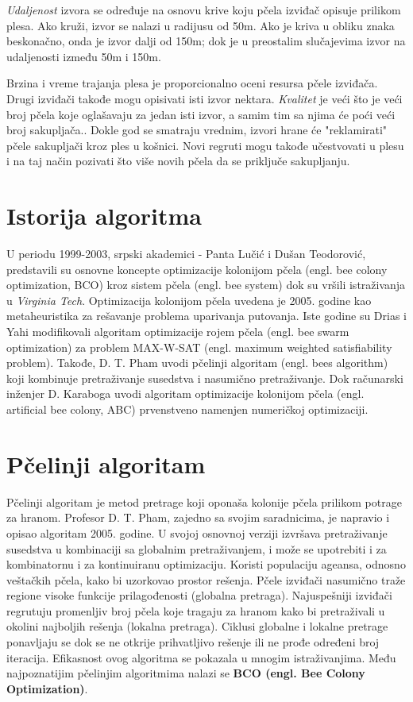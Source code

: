 \documentclass[a4paper]{article}
\begin{document}
{{\em Udaljenost} izvora se određuje na osnovu krive koju pčela izviđač opisuje prilikom plesa. Ako kruži, izvor se nalazi u radijusu od 50m. Ako je kriva u obliku znaka beskonačno, onda je izvor dalji od 150m; dok je u preostalim slučajevima izvor na udaljenosti između 50m i 150m.

Brzina i vreme trajanja plesa je proporcionalno oceni resursa pčele izviđača. Drugi izviđači takođe mogu opisivati isti izvor nektara. {\em Kvalitet} je veći što je veći broj pčela koje oglašavaju za jedan isti izvor, a samim tim sa njima će poći veći broj sakupljača.\cite{plespcela}. Dokle god se smatraju vrednim, izvori hrane će "reklamirati" pčele sakupljači kroz ples u košnici. Novi regruti mogu takođe učestvovati u plesu i na taj način pozivati što više novih pčela da se priključe sakupljanju. 



\section{Istorija algoritma}
U periodu 1999-2003, srpski akademici - Panta Lučić i Dušan Teodorović, predstavili su osnovne koncepte optimizacije kolonijom pčela (engl. bee colony optimization, BCO) kroz sistem pčela (engl. bee system) dok su vršili istraživanja u {\em Virginia Tech}\cite{algoritam}. Optimizacija kolonijom pčela uvedena je 2005. godine kao metaheuristika za rešavanje problema uparivanja putovanja. Iste godine su Drias i
Yahi modifikovali algoritam optimizacije rojem pčela (engl. bee swarm optimization) za
problem MAX-W-SAT (engl. maximum weighted satisfiability problem). Takođe, D. T. Pham uvodi pčelinji algoritam (engl. bees algorithm) koji kombinuje
pretraživanje susedstva i nasumično pretraživanje.\cite{istorijat} Dok računarski inženjer D. Karaboga uvodi algoritam optimizacije kolonijom pčela (engl. artificial bee colony, ABC) prvenstveno
namenjen numeričkoj optimizaciji.


\section{Pčelinji algoritam}
Pčelinji algoritam je metod pretrage koji oponaša kolonije pčela prilikom potrage za hranom\cite{sajt_algoritma}. Profesor D. T. Pham, zajedno sa svojim saradnicima, je napravio i opisao algoritam 2005. godine.
U svojoj osnovnoj verziji izvršava pretraživanje susedstva u kombinaciji sa globalnim pretraživanjem, i može se upotrebiti i za kombinatornu i za kontinuiranu optimizaciju. Koristi populaciju ageansa, odnosno veštačkih pčela, kako bi uzorkovao prostor rešenja. Pčele izviđači nasumično traže regione visoke funkcije prilagođenosti (globalna pretraga). Najuspešniji izviđači regrutuju promenljiv broj pčela koje tragaju za hranom kako bi pretraživali u okolini najboljih rešenja (lokalna pretraga).
Ciklusi globalne i lokalne pretrage ponavljaju se dok se ne otkrije prihvatljivo rešenje ili ne prođe određeni broj iteracija. Efikasnost ovog algoritma se pokazala u mnogim istraživanjima. 
Među najpoznatijim pčelinjim algoritmima nalazi se \textbf{BCO (engl. Bee Colony Optimization)}.

}
\end{document}
